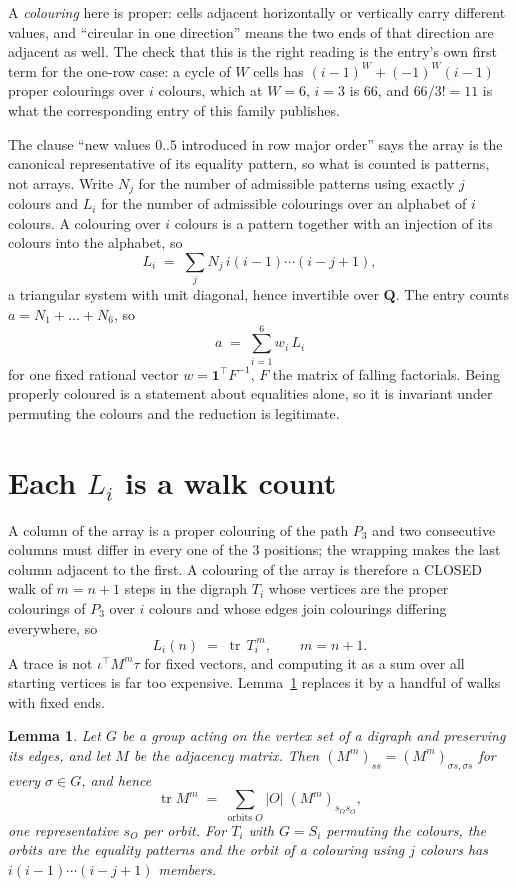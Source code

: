 \documentclass[11pt,a4paper]{article}
\theoremstyle{plain}
\newtheorem{lemma}[theorem]{Lemma}
\theoremstyle{definition}
\begin{document}
A \emph{colouring} here is proper: cells adjacent horizontally or vertically carry different
values, and ``circular in one direction'' means the two ends of that direction are adjacent as
well. The check that this is the right reading is the entry's own first term for the
one-row case: a cycle of $W$ cells has $(i-1)^W+(-1)^W(i-1)$ proper colourings over $i$
colours, which at $W=6$, $i=3$ is $66$, and $66/3!=11$ is what the corresponding entry of this
family publishes.

The clause ``new values $0..5$ introduced in row major order'' says the array is the
canonical representative of its equality pattern, so what is counted is patterns, not arrays.
Write $N_j$ for the number of admissible patterns using exactly $j$ colours and $L_i$ for the
number of admissible colourings over an alphabet of $i$ colours. A colouring over $i$ colours
is a pattern together with an injection of its colours into the alphabet, so
\[
L_i\;=\;\sum_j N_j\,i(i-1)\cdots(i-j+1),
\]
a triangular system with unit diagonal, hence invertible over $\mathbf{Q}$. The entry counts
$a=N_1+\dots+N_{6}$, so
\[
a\;=\;\sum_{i=1}^{6}w_i\,L_i
\]
for one fixed rational vector $w=\mathbf{1}^{\!\top}F^{-1}$, $F$ the matrix of falling
factorials. Being properly coloured is a statement about equalities alone, so it is invariant
under permuting the colours and the reduction is legitimate.

\section{Each $L_i$ is a walk count}

A column of the array is a proper colouring of the path $P_{3}$ and two consecutive
columns must differ in every one of the $3$ positions; the wrapping makes the last column
adjacent to the first. A colouring of the array is therefore a CLOSED walk of $m=n+1$ steps
in the digraph $T_i$ whose vertices are the proper colourings of $P_{3}$ over $i$ colours
and whose edges join colourings differing everywhere, so
\[
L_i(n)\;=\;\operatorname{tr}\,T_i^{\,m},\qquad m=n+1.
\]
A trace is not $\iota^{\!\top}M^m\tau$ for fixed vectors, and computing it as a sum over all
starting vertices is far too expensive. Lemma~\ref{lem:trace} replaces it by a handful of
walks with fixed ends.

\begin{lemma}\label{lem:trace}
Let $G$ be a group acting on the vertex set of a digraph and preserving its edges, and let $M$
be the adjacency matrix. Then $(M^m)_{ss}=(M^m)_{\sigma s,\sigma s}$ for every
$\sigma\in G$, and hence
\[
\operatorname{tr} M^m\;=\;\sum_{\text{orbits }O}|O|\;(M^m)_{s_O s_O} ,
\]
one representative $s_O$ per orbit. For $T_i$ with $G=S_i$ permuting the colours, the orbits
are the equality patterns and the orbit of a colouring using $j$ colours has
$i(i-1)\cdots(i-j+1)$ members.
\end{lemma}
\end{document}
